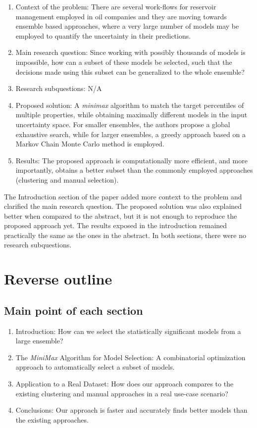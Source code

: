 \documentclass[]{report}
\begin{document}
\begin{enumerate}
\item Context of the problem: There are several work-flows for reservoir management employed in oil companies and they are moving towards ensemble based approaches, where a very large number of models may be employed to quantify the uncertainty in their predictions.
\item Main research question: Since working with possibly thousands of models is impossible, how can a subset of these models be selected, such that the decisions made using this subset can be generalized to the whole ensemble?
\item Research subquestions: N/A
\item Proposed solution: A \textit{minimax} algorithm to match the target percentiles of multiple properties, while obtaining maximally different models in the input uncertainty space. For smaller ensembles, the authors propose a global exhaustive search, while for larger ensembles, a greedy approach based on a Markov Chain Monte Carlo method is employed.
\item Results: The proposed approach is computationally more efficient, and more importantly, obtains a better subset than the commonly employed approaches (clustering and manual selection).
\end{enumerate}

The Introduction section of the paper added more context to the problem and clarified the main research question. The proposed solution was also explained better when compared to the abstract, but it is not enough to reproduce the proposed approach yet. The results exposed in the introduction remained practically the same as the ones in the abstract. In both sections, there were no research subquestions.

\section{Reverse outline}
\subsection{Main point of each section}
\begin{enumerate}
\item Introduction: How can we select the statistically significant models from a large ensemble?
\item The \textit{MiniMax} Algorithm for Model Selection: A combinatorial optimization approach to automatically select a subset of models.
\item Application to a Real Dataset: How does our approach compares to the existing clustering and manual approaches in a real use-case scenario?
\item Conclusions: Our approach is faster and accurately finds better models than the existing approaches.
\end{enumerate}
\end{document}
